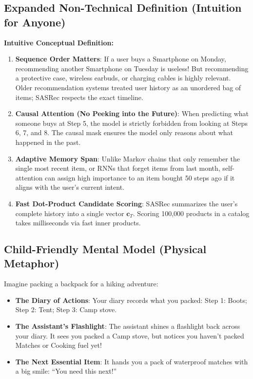\documentclass[11pt,a4paper]{article}
\theoremstyle{definition}
\begin{document}
\subsection{Expanded Non-Technical Definition (Intuition for Anyone)}
\textbf{Intuitive Conceptual Definition:}
\begin{enumerate}
    \item \textbf{Sequence Order Matters}: If a user buys a Smartphone on Monday, recommending another Smartphone on Tuesday is useless! But recommending a protective case, wireless earbuds, or charging cables is highly relevant. Older recommendation systems treated user history as an unordered bag of items; SASRec respects the exact timeline.
    \item \textbf{Causal Attention (No Peeking into the Future)}: When predicting what someone buys at Step 5, the model is strictly forbidden from looking at Steps 6, 7, and 8. The causal mask ensures the model only reasons about what happened in the past.
    \item \textbf{Adaptive Memory Span}: Unlike Markov chains that only remember the single most recent item, or RNNs that forget items from last month, self-attention can assign high importance to an item bought 50 steps ago if it aligns with the user's current intent.
    \item \textbf{Fast Dot-Product Candidate Scoring}: SASRec summarizes the user's complete history into a single vector $\mathbf{c}_T$. Scoring 100,000 products in a catalog takes milliseconds via fast inner products.
\end{enumerate}

\subsection{Child-Friendly Mental Model (Physical Metaphor)}
Imagine packing a backpack for a hiking adventure:
\begin{itemize}
    \item \textbf{The Diary of Actions}: Your diary records what you packed: Step 1: Boots; Step 2: Tent; Step 3: Camp stove.
    \item \textbf{The Assistant's Flashlight}: The assistant shines a flashlight back across your diary. It sees you packed a Camp stove, but notices you haven't packed Matches or Cooking fuel yet!
    \item \textbf{The Next Essential Item}: It hands you a pack of waterproof matches with a big smile: ``You need this next!''
\end{itemize}
\end{document}
